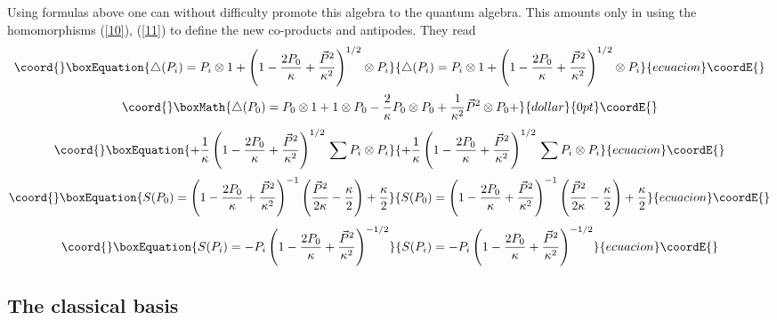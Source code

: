 \documentclass[a4paper,a4paper]{article}
\begin{document}
 Using  formulas above one can without difficulty promote this algebra to the quantum algebra. This
 amounts only in using the homomorphisms (\ref{10}), (\ref{11}) to define the new co-products and antipodes. They read
\begin{equation}\coord{}\boxEquation{\label{6s}
  \triangle(P_{i})=P_{i} \otimes 1 + \left(1 - \frac{2P_{0}}{\kappa} +
   \frac{\vec{P}^{2}}{\kappa^{2}}\right)^{{1}/{2}} \otimes P_{i}
}{\triangle(P_{i})=P_{i} \otimes 1 + \left(1 - \frac{2P_{0}}{\kappa} +
   \frac{\vec{P}^{2}}{\kappa^{2}}\right)^{{1}/{2}} \otimes P_{i}
}{ecuacion}\coordE{}\end{equation}
$$\coord{}\boxMath{
  \triangle(P_{0})=P_{0} \otimes 1 + 1 \otimes P_{0} -
  \frac{2}{\kappa}P_{0} \otimes P_{0} + \frac{1}{\kappa^{2}}
   \vec{P}^{2}\otimes P_{0} +
}{dollar}{0pt}\coordE{}$$
\begin{equation}\coord{}\boxEquation{\label{7s}
   + \frac{1}{\kappa} \left(1 - \frac{2P_{0}}{\kappa} +
   \frac{\vec{P}^{2}}{\kappa^{2}}\right)^{{1}/{2}} \, \sum P_{i}\otimes P_{i}
}{+ \frac{1}{\kappa} \left(1 - \frac{2P_{0}}{\kappa} +
   \frac{\vec{P}^{2}}{\kappa^{2}}\right)^{{1}/{2}} \, \sum P_{i}\otimes P_{i}
}{ecuacion}\coordE{}\end{equation}
\begin{equation}\coord{}\boxEquation{\label{8s}
    S(P_{0})=\left(1 - \frac{2P_{0}}{\kappa} + \frac{\vec{P}^{2}}{\kappa^{2}}\right)^{-1}
  \left(\frac{\vec{P}^{2}}{2\kappa} - \frac{\kappa}{2}\right) + \frac{\kappa}{2}
}{S(P_{0})=\left(1 - \frac{2P_{0}}{\kappa} + \frac{\vec{P}^{2}}{\kappa^{2}}\right)^{-1}
  \left(\frac{\vec{P}^{2}}{2\kappa} - \frac{\kappa}{2}\right) + \frac{\kappa}{2}
}{ecuacion}\coordE{}\end{equation}
\begin{equation}\coord{}\boxEquation{\label{9s}
  S(P_{i})=-P_{i}\left(1 - \frac{2P_{0}}{\kappa} + \frac{\vec{P}^{2}}{\kappa^{2}}\right)^{-1/2}
}{S(P_{i})=-P_{i}\left(1 - \frac{2P_{0}}{\kappa} + \frac{\vec{P}^{2}}{\kappa^{2}}\right)^{-1/2}
}{ecuacion}\coordE{}\end{equation}


\subsection{The classical basis}
\end{document}
